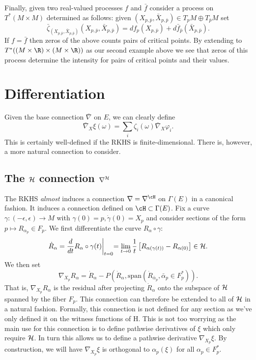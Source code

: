 \documentclass{article}
\begin{document}
Finally, given two real-valued processes $f$ and $\bar{f}$ consider a process on $T^*(M \times M)$ determined as follows: given $(X_{p,\bar{p}}, \bar{X}_{p,\bar{p}}) \in T_pM \oplus T_{\bar{p}}M$
set
$$
\bar{\zeta}_{(X_{p,\bar{p}}, \bar{X}_{p,\bar{p}})}(X_{p,\bar{p}}, \bar{X}_{p,\bar{p}}) = df_p(X_{p,\bar{p}}) + d\bar{f}_{\bar{p}}(\bar{X}_{p,\bar{p}}).
$$ If $f=\bar{f}$ then zeros of the above counts pairs of critical
points. By extending to $T^*((M \times \R) \times (M \times \R))$ as
our second example above we see that zeros of this process determine
the intensity for pairs of critical points and their values.

\section{Differentiation}

Given the base connection $\bar{\nabla}$ on $E$, we can clearly define
$$
\bar{\nabla}_X\xi(\omega) = \sum_i \zeta_i(\omega) \bar{\nabla}_X \varphi_i.
$$
This is certainly well-defined if the RKHS is finite-dimensional. There is, however, a more natural
connection to consider.

\subsection{The ${\cal H}$ connection $\nabla^{\cal H}$}

The RKHS {\em almost} induces a connection $\nabla=\nabla^{\cH}$ on $\Gamma(E)$  in a canonical fashion.
It induces a connection defined on $\cH \subset \Gamma(E)$.
Fix a curve $\gamma:(-\epsilon,\epsilon) \to M$ with $\gamma(0)=p, \dot{\gamma}(0)=X_p$
and consider sections of the form
$p \mapsto R_{\alpha_p} \in F_p$. We first differentiate the curve $R_{\alpha} \circ \gamma$:
\begin{equation}
\dot{R}_{\alpha} = \frac{d}{dt} R_{\alpha} \circ \gamma(t) \biggl|_{t=0} = \lim_{t \to 0} \frac{1}{t} \left[ R_{\alpha(\gamma(t))} - R_{\alpha(0)}\right] \in {\cal H}.
\end{equation}
We then set
$$
\nabla_{X_p}R_{\alpha} = \dot{R}_{\alpha} - P(\dot{R}_{\alpha}, \text{span}(\dot{R}_{\bar{\alpha}_p}, \bar{\alpha}_p \in F_p^*)).
$$
That is, $\nabla_{X_p}R_{\alpha}$ is the residual after projecting $\dot{R}_{\alpha}$ onto the subspace of ${\cal H}$ spanned by the fiber $F_p$.
This connection can therefore be extended to all of ${\cal H}$ in a natural fashion.
Formally, this connection is not defined for any section as we've only defined it on the witness functions of {\cal H}. This is not too worrying as the main use for this connection is to define pathwise derivatives of $\xi$ which only require
${\cal H}$. In turn this allows us to define
a pathwise derivative $\nabla_{X_p}\xi$. By construction, we will have $\nabla_{X_p}\xi$ is orthogonal
to $\alpha_p(\xi)$ for all $\alpha_p \in F_p^*$.
\end{document}

